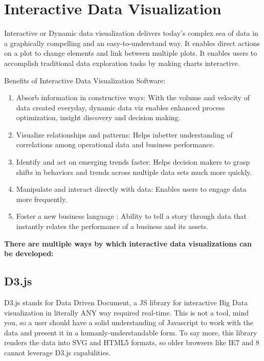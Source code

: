 \documentclass[]{book}
\providecommand{\tightlist}{%
  \setlength{\itemsep}{0pt}\setlength{\parskip}{0pt}}
\theoremstyle{definition}
\theoremstyle{definition}
\theoremstyle{definition}
\theoremstyle{remark}
\begin{document}
\section{Interactive Data
Visualization}\label{interactive-data-visualization}

Interactive or Dynamic data visualization delivers today's complex sea
of data in a graphically compelling and an easy-to-understand way. It
enables direct actions on a plot to change elements and link between
multiple plots. It enables users to accomplish traditional data
exploration tasks by making charts
interactive\citep{benefits_interactive_viz}.

Benefits of Interactive Data Visualization Software:

\begin{enumerate}
\def\labelenumi{\arabic{enumi}.}
\tightlist
\item
  Absorb information in constructive ways: With the volume and velocity
  of data created everyday, dynamic data viz enables enhanced process
  optimization, insight discovery and decision making.
\item
  Visualize relationships and patterns: Helps inbetter understanding of
  correlations among operational data and business performance.
\item
  Identify and act on emerging trends faster: Helps decision makers to
  grasp shifts in behaviors and trends across multiple data sets much
  more quickly.
\item
  Manipulate and interact directly with data: Enables users to engage
  data more frequently.
\item
  Foster a new business language : Ability to tell a story through data
  that instantly relates the performance of a business and its assets.
\end{enumerate}

\textbf{There are multiple ways by which interactive data visualizations
can be developed:}

\subsection{D3.js}\label{d3.js}

D3.js stands for Data Driven Document, a JS library for interactive Big
Data visualization in literally ANY way required
real-time\citep{d3_interactive_viz}. This is not a tool, mind you, so a
user should have a solid understanding of Javascript to work with the
data and present it in a humanly-understandable form. To say more, this
library renders the data into SVG and HTML5 formats, so older browsers
like IE7 and 8 cannot leverage D3.js capabilities.
\end{document}
